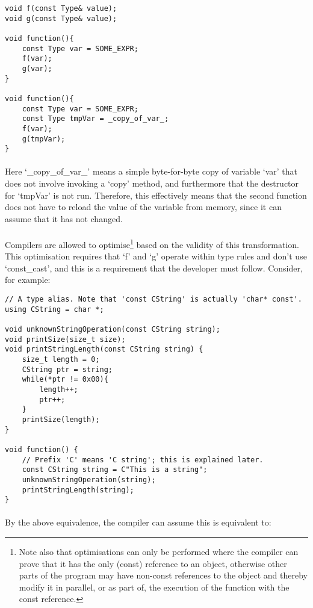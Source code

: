 \documentclass[12pt,twoside,notitlepage]{report}
\begin{document}
\begin{lstlisting}
void f(const Type& value);
void g(const Type& value);

void function(){
	const Type var = SOME_EXPR;
	f(var);
	g(var);
}

void function(){
	const Type var = SOME_EXPR;
	const Type tmpVar = _copy_of_var_;
	f(var);
	g(tmpVar);
}
\end{lstlisting}

\paragraph{}
Here `\_copy\_of\_var\_' means a simple byte-for-byte copy of variable `var' that does not involve invoking a `copy' method, and furthermore that the destructor for `tmpVar' is not run. Therefore, this effectively means that the second function does not have to reload the value of the variable from memory, since it can assume that it has not changed.

\paragraph{}
Compilers are allowed to optimise\footnote{Note also that optimisations can only be performed where the compiler can prove that it has the only (const) reference to an object, otherwise other parts of the program may have non-const references to the object and thereby modify it in parallel, or as part of, the execution of the function with the const reference.} based on the validity of this transformation. This optimisation requires that `f' and `g' operate within type rules and don't use `const\_cast', and this is a requirement that the developer must follow. Consider, for example:

\begin{lstlisting}
// A type alias. Note that 'const CString' is actually 'char* const'.
using CString = char *;

void unknownStringOperation(const CString string);
void printSize(size_t size);
void printStringLength(const CString string) {
	size_t length = 0;
	CString ptr = string;
	while(*ptr != 0x00){
		length++;
		ptr++;
	}
	printSize(length);
}

void function() {
	// Prefix 'C' means 'C string'; this is explained later.
	const CString string = C"This is a string";
	unknownStringOperation(string);
	printStringLength(string);
}
\end{lstlisting}

\paragraph{}
By the above equivalence, the compiler can assume this is equivalent to:
\end{document}
